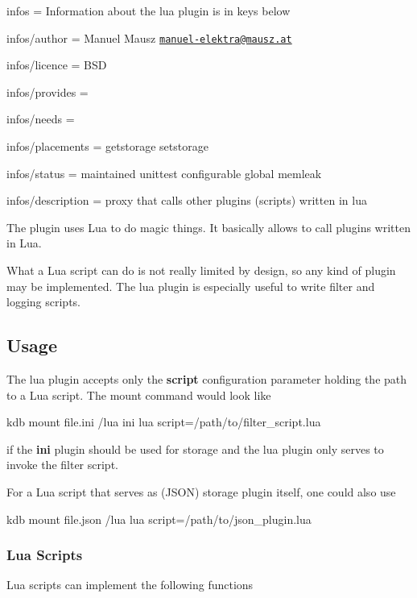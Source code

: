 
\begin{DoxyItemize}
\item infos = Information about the lua plugin is in keys below
\item infos/author = Manuel Mausz \href{mailto:manuel-elektra@mausz.at}{\tt manuel-\/elektra@mausz.\+at}
\item infos/licence = B\+SD
\item infos/provides =
\item infos/needs =
\item infos/placements = getstorage setstorage
\item infos/status = maintained unittest configurable global memleak
\item infos/description = proxy that calls other plugins (scripts) written in lua
\end{DoxyItemize}

The plugin uses Lua to do magic things. It basically allows to call plugins written in Lua.

What a Lua script can do is not really limited by design, so any kind of plugin may be implemented. The lua plugin is especially useful to write filter and logging scripts.

\subsection*{Usage}

The lua plugin accepts only the {\bfseries script} configuration parameter holding the path to a Lua script. The mount command would look like \begin{DoxyVerb}kdb mount file.ini /lua ini lua script=/path/to/filter_script.lua
\end{DoxyVerb}


if the {\bfseries ini} plugin should be used for storage and the lua plugin only serves to invoke the filter script.

For a Lua script that serves as (J\+S\+ON) storage plugin itself, one could also use \begin{DoxyVerb}kdb mount file.json /lua lua script=/path/to/json_plugin.lua
\end{DoxyVerb}


\subsubsection*{Lua Scripts}

Lua scripts can implement the following functions



